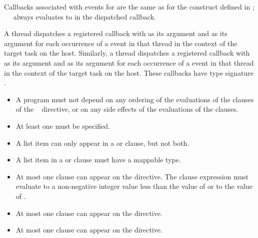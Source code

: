 Callbacks associated with events for  are the same as
for the  construct defined in ;
\code{(}~\code{&}~ 
always evaluates to  in the dispatched callback.

A thread dispatches a registered  callback with 
 as its  argument and 
 as its  argument for each occurrence 
of a  event in that thread in the context of the 
target task on the host. Similarly, a thread dispatches a registered 
 callback with  as its 
 argument and  as its  
argument for each occurrence of a  event in that thread 
in the context of the target task on the host. These callbacks have 
type signature . 



\restrictions
\begin{itemize}
\item A program must not depend on any ordering of the evaluations of the 
      clauses of the ~ directive, or on any side 
      effects of the evaluations of the clauses.
\item At least one  must be specified.
\item A list item can only appear in a  or  clause, but not both.
\item A list item in a  or  clause must have a mappable type.
\item At most one  clause can appear on the directive. The
       clause expression must evaluate to a non-negative integer 
      value less than the value of  or to the value of 
      .
\item At most one  clause can appear on the directive.
\item At most one  clause can appear on the directive.
\end{itemize}

